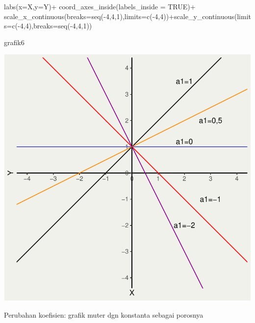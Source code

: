 \documentclass[
  letterpaper,
  DIV=11,
  numbers=noendperiod]{scrartcl}
\newenvironment{Shaded}{\begin{snugshade}}{\end{snugshade}}
\newcommand{\AttributeTok}[1]{\textcolor[rgb]{0.40,0.45,0.13}{#1}}
\newcommand{\ConstantTok}[1]{\textcolor[rgb]{0.56,0.35,0.01}{#1}}
\newcommand{\DecValTok}[1]{\textcolor[rgb]{0.68,0.00,0.00}{#1}}
\newcommand{\FunctionTok}[1]{\textcolor[rgb]{0.28,0.35,0.67}{#1}}
\newcommand{\NormalTok}[1]{\textcolor[rgb]{0.00,0.23,0.31}{#1}}
\newcommand{\SpecialCharTok}[1]{\textcolor[rgb]{0.37,0.37,0.37}{#1}}
\newcommand{\StringTok}[1]{\textcolor[rgb]{0.13,0.47,0.30}{#1}}
\begin{document}
\begin{Shaded}
\begin{Highlighting}[]
  \FunctionTok{labs}\NormalTok{(}\AttributeTok{x=}\StringTok{\textquotesingle{}X\textquotesingle{}}\NormalTok{,}\AttributeTok{y=}\StringTok{\textquotesingle{}Y\textquotesingle{}}\NormalTok{)}\SpecialCharTok{+}
  \FunctionTok{coord\_axes\_inside}\NormalTok{(}\AttributeTok{labels\_inside =} \ConstantTok{TRUE}\NormalTok{)}\SpecialCharTok{+}
  \FunctionTok{scale\_x\_continuous}\NormalTok{(}\AttributeTok{breaks=}\FunctionTok{seq}\NormalTok{(}\SpecialCharTok{{-}}\DecValTok{4}\NormalTok{,}\DecValTok{4}\NormalTok{,}\DecValTok{1}\NormalTok{),}\AttributeTok{limits=}\FunctionTok{c}\NormalTok{(}\SpecialCharTok{{-}}\DecValTok{4}\NormalTok{,}\DecValTok{4}\NormalTok{))}\SpecialCharTok{+}\FunctionTok{scale\_y\_continuous}\NormalTok{(}\AttributeTok{limits=}\FunctionTok{c}\NormalTok{(}\SpecialCharTok{{-}}\DecValTok{4}\NormalTok{,}\DecValTok{4}\NormalTok{),}\AttributeTok{breaks=}\FunctionTok{seq}\NormalTok{(}\SpecialCharTok{{-}}\DecValTok{4}\NormalTok{,}\DecValTok{4}\NormalTok{,}\DecValTok{1}\NormalTok{))}

\NormalTok{grafik6}
\end{Highlighting}
\end{Shaded}

\includegraphics{index_files/figure-pdf/unnamed-chunk-7-1.pdf}

Perubahan koefisien: grafik muter dgn konstanta sebagai porosnya
\end{document}
